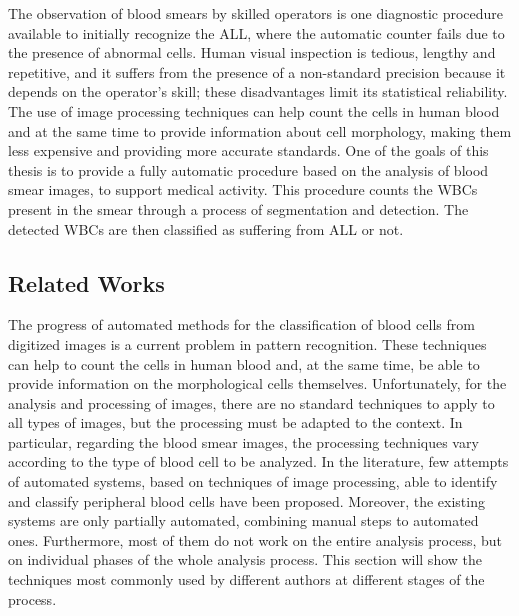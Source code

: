 The observation of blood smears by skilled operators is one diagnostic procedure available to initially recognize the ALL, where the automatic counter fails due to the presence of abnormal cells. Human visual inspection is tedious, lengthy and repetitive, and it suffers from the presence of a non-standard precision because it depends on the operator's skill; these disadvantages limit its statistical reliability. The use of image processing techniques can help count the cells in human blood and at the same time to provide information about cell morphology, making them less expensive and providing more accurate standards. One of the goals of this thesis is to provide a fully automatic procedure based on the analysis of blood smear images, to support medical activity. This procedure counts the WBCs present in the smear through a process of segmentation and detection. The detected WBCs are then classified as suffering from ALL or not. 

\subsection {Related Works}
The progress of automated methods for the classification of blood cells from digitized images is a current problem in pattern recognition. These techniques can help to count the cells in human blood and, at the same time, be able to provide information on the morphological cells themselves. Unfortunately, for the analysis and processing of images, there are no standard techniques to apply to all types of images, but the processing must be adapted to the context. In particular, regarding the blood smear images, the processing techniques vary according to the type of blood cell to be analyzed. In the literature, few attempts of automated systems, based on techniques of image processing, able to identify and classify peripheral blood cells have been proposed.
Moreover, the existing systems are only partially automated, combining manual steps to automated ones. Furthermore, most of them do not work on the entire analysis process, but on individual phases of the whole analysis process. This section will show the techniques most commonly used by different authors at different stages of the process. 

